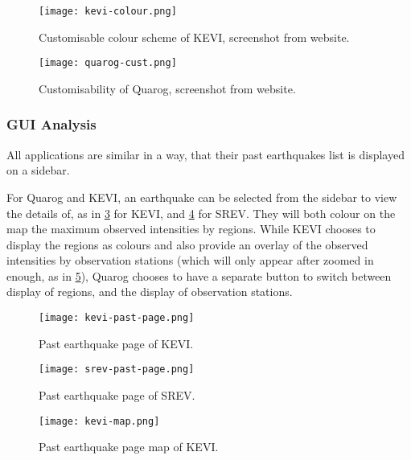 \begin{figure}[htp]
    \centering

    \texttt{[image: kevi-colour.png]}
    \caption[Customisable colour scheme of KEVI]{Customisable colour scheme of KEVI, screenshot from website.}
    \label{fig:kevi-colour-cust}
\end{figure}

\begin{figure}[htp]
    \centering

    \texttt{[image: quarog-cust.png]}
    \caption[Customisability of Quarog]{Customisability of Quarog, screenshot from website.}
    \label{fig:quarog-cust}
\end{figure}

\subsubsection{GUI Analysis}

All applications are similar in a way, that their past earthquakes list is displayed on a sidebar.

For Quarog and KEVI, an earthquake can be selected from the sidebar to view the details of, as in \ref{fig:kevi-past-page} for KEVI, and \ref{fig:srev-past-page} for SREV. They will both colour on the map the maximum observed intensities by regions. While KEVI chooses to display the regions as colours and also provide an overlay of the observed intensities by observation stations (which will only appear after zoomed in enough, as in \ref{fig:kevi-map}), Quarog chooses to have a separate button to switch between display of regions, and the display of observation stations.

\begin{figure}[htp]
    \centering

    \texttt{[image: kevi-past-page.png]}
    \caption{Past earthquake page of KEVI.}
    \label{fig:kevi-past-page}
\end{figure}

\begin{figure}[htp]
    \centering

    \texttt{[image: srev-past-page.png]}
    \caption{Past earthquake page of SREV.}
    \label{fig:srev-past-page}
\end{figure}

\begin{figure}[htp]
    \centering

    \texttt{[image: kevi-map.png]}
    \caption{Past earthquake page map of KEVI.}
    \label{fig:kevi-map}
\end{figure}

